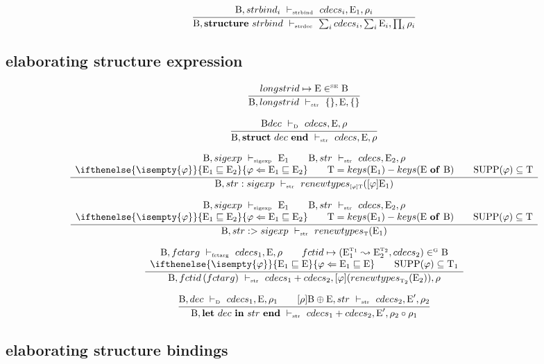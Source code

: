 \documentclass[11pt,a4paper]{article}
\newcommand{\key}[1]{\textrm{\textbf{#1}}}
\newcommand{\End}       {\key{end}}
\newcommand{\of}        {\key{of}}
\newcommand{\Let}       {\key{let}}
\newcommand{\Structure} {\key{structure}}
\newcommand{\Struct}	{\key{struct}}
\newcommand{\In}        {\key{in}}
\newcommand{\B}  {\textrm{B}}
\newcommand{\E}  {\textrm{E}}
\newcommand{\T}  {\textrm{T}}
\newcommand{\sT} {\textrm{\tiny T}}
\newcommand{\sSE}{\textrm{\tiny SE}}
\newcommand{\sG} {\textrm{\tiny G}}
\newcommand{\vdashSigexp}  {\ \vdash_{\textrm{\tiny sigexp}}\ }
\newcommand{\vdashStr}		{\ \vdash_{\textrm{\tiny str}}\ }
\newcommand{\vdashStrDec}	{\ \vdash_{\textrm{\tiny strdec}}\ }
\newcommand{\vdashStrBind} {\ \vdash_{\textrm{\tiny strbind}}\ }
\newcommand{\vdashFctArg}  {\ \vdash_{\textrm{\tiny fctarg}}\ }
\newcommand{\vdashD}       {\ \vdash_{\textrm{\tiny D}}\ }
\newcommand{\braced}[1]{\{#1\}}
\newcommand{\fctor}[2]{#1 \leadsto #2}
\newcommand{\matchEnv}[3][]{ \ifthenelse{\isempty{#1}}{#2 \sqsubseteq #3}{#1 \Leftarrow #2 \sqsubseteq #3}}
\newcommand{\SUPP}[1]{\textrm{SUPP}(#1)}
\newcommand{\KEYS}[1]{keys(#1)}
\newcommand{\TYNAMES}[1]{\KEYS{#1}}
\newcommand{\GENTYPES}[2]{renewtypes_{\textrm{\tiny $#1$}}(#2)}
\newcommand{\compose}[2]{#1 \circ #2}
\newcommand{\Empty}{\braced{}}
\begin{document}
\[
\cfrac
 {\B, strbind_i \vdashStrBind cdecs_i, \E_1, \rho_i}
 {\B, \Structure\ strbind \vdashStrDec \sum_i cdecs_i, \sum_i \E_i, \prod_i \rho_i}
\]

\subsection{elaborating structure expression}

\[
\cfrac
 {longstrid \mapsto \E \in^\sSE \B}
 {\B, longstrid \vdashStr \Empty,\E,\Empty}
\]

\[
\cfrac
 {\B dec \vdashD cdecs,\E,\rho}
 {\B, \Struct\ dec\ \End \vdashStr cdecs,\E,\rho}
\]

\[
\cfrac
 {\begin{array}{c}
  \B,sigexp \vdashSigexp \E_1  		 \qquad
  \B,str \vdashStr cdecs,\E_2,\rho	 \\
  \matchEnv[\varphi]{\E_1}{\E_2}	 \qquad	
  \T = \TYNAMES{\E_1} - \TYNAMES{\E\ \of\ \B} \qquad
  \SUPP{\varphi}\subseteq\T
  \end{array}}
 {\B, str:sigexp \vdashStr \GENTYPES{[\varphi]\T}{[\varphi]\E_1}}
\]

\[
\cfrac
 {\begin{array}{c}
  \B,sigexp \vdashSigexp \E_1	     \qquad
  \B,str \vdashStr cdecs,\E_2,\rho	 \\
  \matchEnv[\varphi]{\E_1}{\E_2}	 \qquad	
  \T = \TYNAMES{\E_1} - \TYNAMES{\E\ \of\ \B} \qquad  
  \SUPP{\varphi}\subseteq\T
  \end{array}}
 {\B, str:>sigexp \vdashStr \GENTYPES{\T}{\E_1}}
\]

\[
\cfrac
 {\begin{array}{c}
  \B,fctarg \vdashFctArg cdecs_1, \E, \rho                              	\qquad
  fctid \mapsto (\fctor{\E_1^{\sT_1}}{\E_2^{\sT_2}}, cdecs_2) \in^\sG \B  	\\
  \matchEnv[\varphi]{\E_1}{\E}                                          	\qquad
  \SUPP{\varphi}\subseteq \T_1                                          	\\
  \end{array}}
 {\B,fctid\,(fctarg) \vdashStr cdecs_1 + cdecs_2, [\varphi](\GENTYPES{\T_2}{\E_2}), \rho}
\]

\[
\cfrac
 {\B, dec \vdashD cdecs_1,\E, \rho_1                    \qquad
  [\rho]\B \oplus \E, str \vdashStr cdecs_2, \E', \rho_2}
 {\B, \Let\ dec\ \In\ str\ \End \vdashStr cdecs_1+cdecs_2,\E', \compose{\rho_2}{\rho_1}}
\]

\subsection{elaborating structure bindings}
\end{document}
